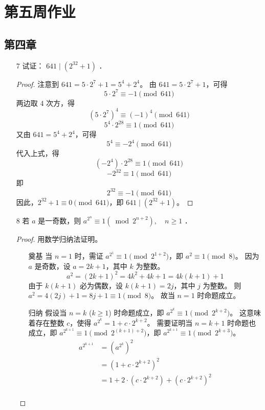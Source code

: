 \section{第五周作业}
\subsection*{第四章}


\begin{enumerate}
    \item[7] 试证： $641 \mid\left(2^{32}+1\right)$ ．
    \begin{proof}
        注意到 $641 = 5 \cdot 2^7 + 1 = 5^4 + 2^4$。
        由 $641 = 5 \cdot 2^7 + 1$，可得
        \[ 5 \cdot 2^7 \equiv -1 \pmod{641} \]
        两边取 4 次方，得
        \[ (5 \cdot 2^7)^4 \equiv (-1)^4 \pmod{641} \]
        \[ 5^4 \cdot 2^{28} \equiv 1 \pmod{641} \]
        又由 $641 = 5^4 + 2^4$，可得
        \[ 5^4 \equiv -2^4 \pmod{641} \]
        代入上式，得
        \[ (-2^4) \cdot 2^{28} \equiv 1 \pmod{641} \]
        \[ -2^{32} \equiv 1 \pmod{641} \]
        即
        \[ 2^{32} \equiv -1 \pmod{641} \]
        因此，$2^{32} + 1 \equiv 0 \pmod{641}$，即 $641 \mid (2^{32}+1)$。
    \end{proof}
    \item[8] 若 $a$ 是一奇数，则 $a^{2^n} \equiv 1\left(\bmod 2^{n+2}\right), \quad n \geqslant 1$ ．
    \begin{proof}
        用数学归纳法证明。
        \begin{enumerate}
            \item[奠基] 当 $n=1$ 时，需证 $a^{2^1} \equiv 1 \pmod{2^{1+2}}$，即 $a^2 \equiv 1 \pmod 8$。
            因为 $a$ 是奇数，设 $a=2k+1$，其中 $k$ 为整数。
            \[ a^2 = (2k+1)^2 = 4k^2+4k+1 = 4k(k+1)+1 \]
            由于 $k(k+1)$ 必为偶数，设 $k(k+1)=2j$，其中 $j$ 为整数。
            则 $a^2 = 4(2j)+1 = 8j+1 \equiv 1 \pmod 8$。
            故当 $n=1$ 时命题成立。
            \item[归纳] 假设当 $n=k$ ($k \ge 1$) 时命题成立，即 $a^{2^k} \equiv 1 \pmod{2^{k+2}}$。
            这意味着存在整数 $c$，使得 $a^{2^k} = 1 + c \cdot 2^{k+2}$。
            需要证明当 $n=k+1$ 时命题也成立，即 $a^{2^{k+1}} \equiv 1 \pmod{2^{(k+1)+2}}$，即 $a^{2^{k+1}} \equiv 1 \pmod{2^{k+3}}$。
            \begin{align*}
                a^{2^{k+1}} &= (a^{2^k})^2 \\
                &= (1 + c \cdot 2^{k+2})^2 \\
                &= 1 + 2 \cdot (c \cdot 2^{k+2}) + (c \cdot 2^{k+2})^2 \\

\end{align*}
\end{enumerate}
\end{proof}
\end{enumerate}
